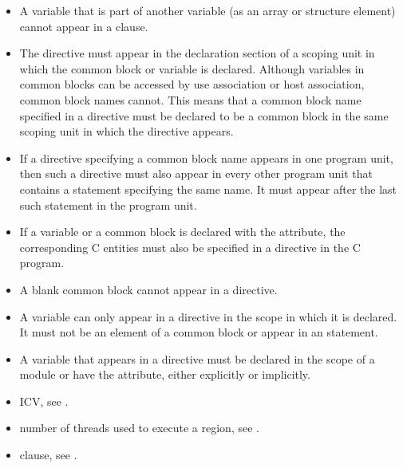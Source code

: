 \fortranspecificstart
\begin{itemize} %
\item A variable that is part of another variable (as an array or structure element) cannot 
appear in a  clause.

\item The  directive must appear in the declaration section of a scoping 
unit in which the common block or variable is declared. Although variables in 
common blocks can be accessed by use association or host association, common 
block names cannot. This means that a common block name specified in a 
 directive must be declared to be a common block in the same 
scoping unit in which the  directive appears. 

\item If a  directive specifying a common block name appears in one 
program unit, then such a directive must also appear in every other program unit that 
contains a  statement specifying the same name. It must appear after the last 
such  statement in the program unit.

\item If a  variable or a  common block is declared 
with the  attribute, the corresponding C entities must also be specified in a 
 directive in the C program.

\item A blank common block cannot appear in a  directive.

\item A variable can only appear in a  directive in the scope in which it 
is declared. It must not be an element of a common block or appear in an 
 statement.

\item A variable that appears in a  directive must be declared in the 
scope of a module or have the  attribute, either explicitly or implicitly.
\end{itemize} %
\fortranspecificend

\crossreferences
\begin{itemize}
\item {} ICV, see 
.

\item number of threads used to execute a  region, see 
.

\item {} clause, see 
.
\end{itemize}








